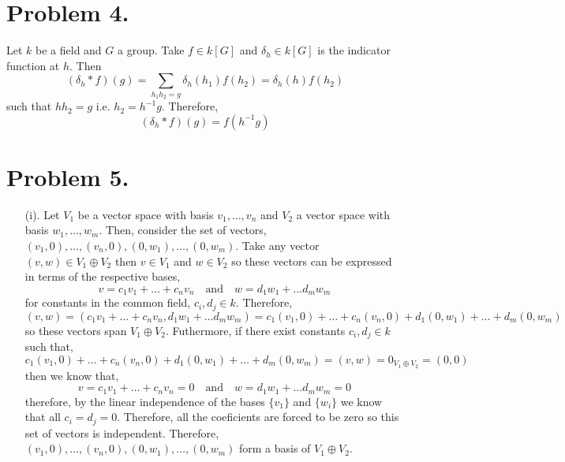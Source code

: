 \documentclass[12pt]{extarticle}
\begin{document}
\section*{Problem 4.}

Let $k$ be a field and $G$ a group. Take $f \in k[G]$ and $\delta_h \in k[G]$ is the indicator function at $h$. Then
\[ (\delta_h * f)(g) = \sum_{h_1 h_2 = g} \delta_h(h_1) f(h_2) = \delta_h(h) f(h_2)\]
such that $h h_2 = g$ i.e. $h_2 = h^{-1} g$. Therefore,
\[ (\delta_h * f)(g) = f(h^{-1} g)\]

\section*{Problem 5.}
\begin{enumerate}
\item[(i).]
Let $V_1$ be a vector space with basis $v_1, \dots, v_n$ and $V_2$ a vector space with basis $w_1, \dots, w_m$. Then, consider the set of vectors, $(v_1, 0), \dots, (v_n, 0), (0, w_1), \dots, (0, w_m)$. Take any vector $(v, w) \in V_1 \oplus V_2$ then $v \in V_1$ 
and $w \in V_2$ so these vectors can be expressed in terms of the respective bases,
\[ v = c_1 v_1 + \dots + c_n v_n \quad \text{and} \quad w = d_1 w_1 + \dots d_m w_m\]
for constants in the common field, $c_i, d_j \in k$. Therefore,
\[(v, w) = (c_1 v_1 + \dots + c_n v_n, d_1 w_1 + \dots d_m w_m) = c_1 (v_1, 0) + \dots + c_n (v_n, 0) + d_1 (0, w_1) + \dots + d_m (0, w_m) \]
so these vectors span $V_1 \oplus V_2$. Futhermore, if there exist constants $c_i, d_j \in k$ such that,
\[ c_1 (v_1, 0) + \dots + c_n (v_n, 0) + d_1 (0, w_1) + \dots + d_m (0, w_m) = (v, w) = 0_{V_1 \oplus V_2} = (0, 0)\]
then we know that,
\[ v = c_1 v_1 + \dots + c_n v_n = 0 \quad \text{and} \quad w = d_1 w_1 + \dots d_m w_m = 0 \]
therefore, by the linear independence of the bases $\{v_1\}$ and $\{w_i\}$ we know that all $c_i = d_j = 0$. Therefore, all the coeficients are forced to be zero so this set of vectors is independent. Therefore, $(v_1, 0), \dots, (v_n, 0), (0, w_1), \dots, (0, w_m)$ form a basis of $V_1 \oplus V_2$. 


\end{enumerate}
\end{document}
